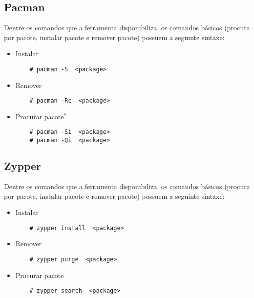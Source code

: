 \subsection{Pacman} %
\label{sub:pacan}

Dentre os comandos que a ferramenta disponibiliza, os comandos básicos (procura por pacote, instalar pacote e remover pacote) possuem a seguinte sintaxe:

\begin{itemize}
	\item Instalar
	\begin{lstlisting}
	# pacman -S  <package>
	\end{lstlisting}
	\item Remover
	\begin{lstlisting}
	# pacman -Rc  <package>
	\end{lstlisting}
	\item Procurar pacote$^*$
	\begin{lstlisting}
	# pacman -Si  <package>
	# pacman -Qi  <package>
	\end{lstlisting}
\end{itemize}


\subsection{Zypper} %
\label{sub:zypper}

Dentre os comandos que a ferramenta disponibiliza, os comandos básicos (procura por pacote, instalar pacote e remover pacote) possuem a seguinte sintaxe:

\begin{itemize}
	\item Instalar
	\begin{lstlisting}
	# zypper install  <package>
	\end{lstlisting}
	\item Remover
	\begin{lstlisting}
	# zypper purge  <package>
	\end{lstlisting}
	\item Procurar pacote
	\begin{lstlisting}
	# zypper search  <package>
	\end{lstlisting}
\end{itemize}
